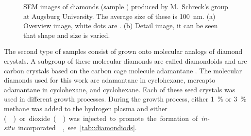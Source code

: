 	\begin{figure}[htp]
		\begin{subfigure}[t]{ 0.49\linewidth}
			\caption{}\label{subfig::cvd_large}
			\centering
		\end{subfigure}
		\hfill
		\begin{subfigure}[t]{ 0.49\linewidth}
			\caption{}\label{subfig::cvd_detail}
			\centering
		\end{subfigure}
		\caption[Example of \CVD \nds]{SEM images of \CVD diamonds (sample \insitucvd) produced by M.\ Schreck's group at Augsburg University. The average size of these \nds is \SI{100}{nm}. (a) Overview image, white dots are \nds. (b) Detail image, it can be seen that \nd shape and size is varied.}
		\label{fig::sem_cvd}
	\end{figure}

	The second type of samples consist of \CVD \nds grown onto molecular analogs of diamond crystals.
	A subgroup of these molecular diamonds are called diamondoids and are carbon crystals based on the carbon cage molecule adamantane .
	The molecular diamonds used for this work are adamantane in cyclohexane, mercapto adamantane in cyclohexane, and cyclohexane.
	Each of these seed crystals was used in different growth processes.
	During the growth process, either \SI{1}{\percent} or \SI{3}{\percent} methane was added to the hydrogen plasma and either \si () or \si dioxide () was injected to promote the formation of \textit{in-situ} incorporated \sivs, see \autoref{tab::diamondiods}.


